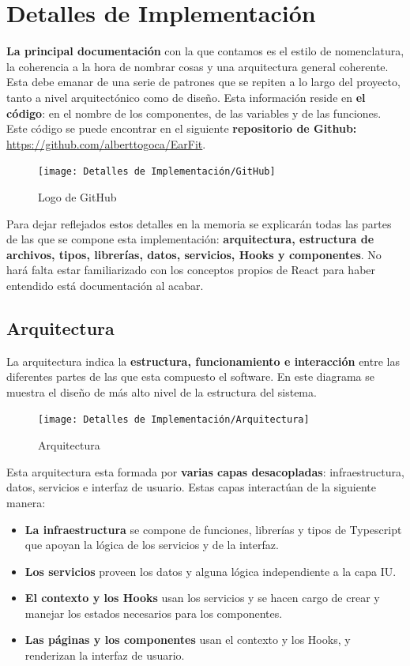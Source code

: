 \documentclass[12pt,twoside,titlepage]{report}
\begin{document}
\section{Detalles de Implementación}
\textbf{La principal documentación} con la que contamos es el estilo de nomenclatura, la coherencia a la hora de nombrar cosas y una arquitectura general coherente. Esta debe emanar de una serie de patrones que se repiten a lo largo del proyecto, tanto a nivel arquitectónico como de diseño. Esta información reside en \textbf{el código}: en el nombre de los componentes, de las variables y de las funciones. Este código se puede encontrar en el siguiente \textbf{repositorio de Github:} \url{https://github.com/alberttogoca/EarFit}.


\begin{figure}[H]
    \centering
    \texttt{[image: Detalles de Implementación/GitHub]}
    \label{fig:GitHubLogo}
    \caption{Logo de GitHub}
\end{figure}

Para dejar reflejados estos detalles en la memoria se explicarán todas las partes de las que se compone esta implementación: \textbf{arquitectura, estructura de archivos, tipos, librerías, datos, servicios, Hooks y componentes}. No hará falta estar familiarizado con los conceptos propios de React para haber entendido está documentación al acabar.

\subsection{Arquitectura}

La arquitectura indica la \textbf{estructura, funcionamiento e interacción} entre las diferentes partes de las que esta compuesto el software. En este diagrama se muestra el diseño de más alto nivel de la estructura del sistema.

\begin{figure}[H]
    \centering
    \texttt{[image: Detalles de Implementación/Arquitectura]}
    \label{fig:Arquitectura}
    \caption{Arquitectura}
\end{figure}

Esta arquitectura esta formada por \textbf{varias capas desacopladas}: infraestructura, datos, servicios e interfaz de usuario. Estas capas interactúan de la siguiente manera:

\begin{itemize}
    \item \textbf{La infraestructura} se compone de funciones, librerías y tipos de Typescript que apoyan la lógica de los servicios y de la interfaz.
    \item \textbf{Los servicios} proveen los datos y alguna lógica independiente a la capa IU.
    \item \textbf{El contexto y los Hooks} usan los servicios y se hacen cargo de crear y manejar los estados necesarios para los componentes.
    \item \textbf{Las páginas y los componentes} usan el contexto y los Hooks, y renderizan la interfaz de usuario.
\end{itemize}
\end{document}
